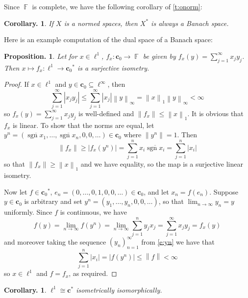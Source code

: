 \documentclass[11pt, a4paper]{memoir}
\DeclareMathOperator{\F}{{\mathbb{F}}}
\newcommand{\norm}[1]{\ensuremath{\left\lVert#1\right\rVert}}
\theoremstyle{change}
\newtheorem{corollary}[theorem]{Corollary.}
\newtheorem{proposition}[theorem]{Proposition.}
\theoremstyle{plain}
\theoremstyle{nonumberplain}
\newtheorem{proof}{Proof}
\DeclareMathOperator{\sgn}{sgn}
\newcommand{\lp}[1]{\ensuremath{\ell^{#1}}}
\newcommand{\csn}{\ensuremath{\mathbf{c}}}
\newcommand{\csz}{\ensuremath{\mathbf{c}_0}}
\numberwithin{equation}{section}
\begin{document}
Since $\F$ is complete, we have the following corollary of \cref{t:onorm}:
\begin{corollary}
    If $X$ is a normed spaces, then $X^*$ is always a Banach space.
\end{corollary}
Here is an example computation of the dual space of a Banach space:
\begin{proposition}
    Let for $x\in\lp{1}$, $f_x:\csz\to\F$ be given by $f_x(y)=\sum_{j=1}^\infty x_jy_j$.
    Then $x\mapsto f_x:\lp{1}\to \csz^*$ is a surjective isometry.
\end{proposition}
\begin{proof}
    If $x\in\lp{1}$ and $y\in \csz\subseteq\lp{\infty}$, then
    \begin{equation*}
        \sum_{j=1}^\infty|x_jy_j|\leq\sum_{j=1}^\infty|x_j|\norm{y}_\infty=\norm{x}_1\norm{y}_\infty<\infty
    \end{equation*}
    so $f_x(y)=\sum_{j=1}^\infty x_jy_j$ is well-defined and $\norm{f_x}\leq\norm{x}_1$.
    It is obvious that $f_x$ is linear.
    To show that the norms are equal, let $y^{n}=(\overline{\sgn x_1},\ldots,\overline{\sgn x_n},0,0,\ldots)\in \csz$ where $\norm{y^n}=1$.
    Then
    \begin{equation}\label{e:yn}
        \norm{f_x}\geq|f_x(y^n)|=\sum_{j=1}^n x_i\overline{\sgn x_i}=\sum_{j=1}^n|x_i|
    \end{equation}
    so that $\norm{f_x}\geq\norm{x}_1$ and we have equality, so the map is a surjective linear isometry.

    Now let $f\in \csz^*$, $e_n=(0,\ldots,0,1,0,0,\ldots)\in \csz$, and let $x_n=f(e_n)$.
    Suppose $y\in \csz$ is arbitrary and set $y^n=(y_1,\ldots,y_n,0,0,\ldots)$, so that $\lim_{n\to\infty}y_n=y$ uniformly.
    Since $f$ is continuous, we have
    \begin{equation*}
        f(y)=\lim_{n\to\infty}f(y^n)=\lim_{n\to\infty}\sum_{j=1}^n y_jx_j=\sum_{j=1}^\infty x_jy_j=f_x(y)
    \end{equation*}
    and moreover taking the sequence $(y_n)_{n=1}^\infty$ from \cref{e:yn} we have that
    \begin{equation*}
        \sum_{j=1}^n|x_i|=|f(y^n)|\leq\norm{f}<\infty
    \end{equation*}
    so $x\in\lp{1}$ and $f=f_x$, as required.
\end{proof}
\begin{corollary}
    $\lp{1}\cong \csn^*$ isometrically isomorphically.
\end{corollary}
\end{document}
